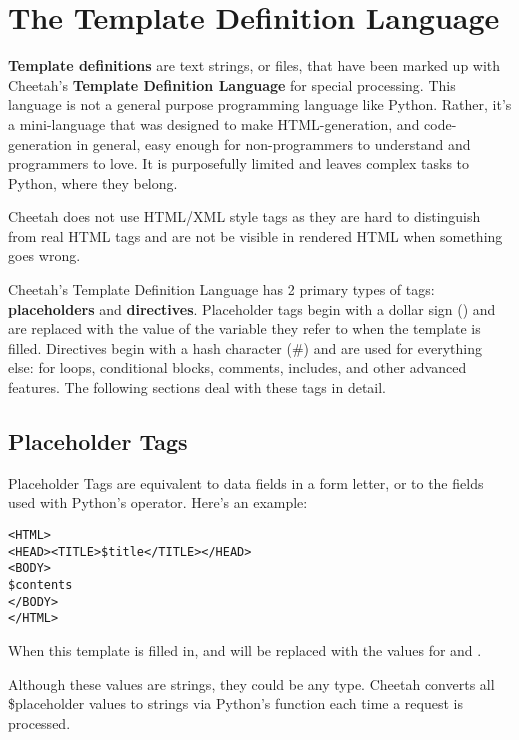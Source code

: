 \section{The Template Definition Language}
\label{TDL}

{\bf Template definitions} are text strings, or files, that have been marked up
with Cheetah's {\bf Template Definition Language} for special processing.  This
language is not a general purpose programming language like Python.  Rather,
it's a mini-language that was designed to make HTML-generation, and
code-generation in general, easy enough for non-programmers to understand and
programmers to love.  It is purposefully limited and leaves complex tasks to
Python, where they belong.

Cheetah does not use HTML/XML style tags as they are hard to distinguish from
real HTML tags and are not be visible in rendered HTML when something goes
wrong.

Cheetah's Template Definition Language has 2 primary types of tags: {\bf
  placeholders} and {\bf directives}. Placeholder tags begin with a dollar sign
() and are replaced with the value of the variable they refer to
when the template is filled. Directives begin with a hash character (\#) and are
used for everything else: for loops, conditional blocks, comments, includes, and
other advanced features. The following sections deal with these tags in detail.

\subsection{Placeholder Tags}
\label{TDL.placeholders}
Placeholder Tags are equivalent to data fields in a form letter, or to the
 fields used with Python's \code{\%} operator. Here's an example:

\begin{verbatim}
<HTML>
<HEAD><TITLE>$title</TITLE></HEAD>
<BODY>
$contents
</BODY>
</HTML>
\end{verbatim}

When this template is filled in,  and  will be
replaced with the values for  and .  

Although these values are strings, they could be any type.  Cheetah converts all
\$placeholder values to strings via Python's  function each time a
request is processed.

